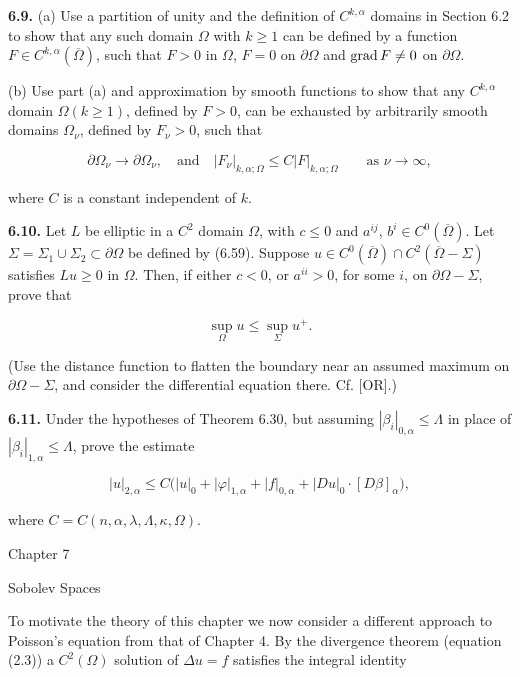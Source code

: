 \medskip

{\bf 6.9.} (a) Use a partition of unity and the definition of $C^{k,\alpha}$ domains in Section 6.2 to show that any such domain $\Omega$ with $k\ge1$ can be defined by a function $F\in C^{k,\alpha}(\overline{\Omega})$, such that $F>0$ in $\Omega$, $F=0$ on $\partial\Omega$ and $\operatorname{grad} F\ne0$ on $\partial\Omega$.

(b) Use part (a) and approximation by smooth functions to show that any $C^{k,\alpha}$ domain $\Omega(k\ge1)$, defined by $F>0$, can be exhausted by arbitrarily smooth domains $\Omega_\nu$, defined by $F_\nu>0$, such that

\[
\partial\Omega_\nu \to \partial\Omega_\nu,\quad\text{and}\quad |F_\nu|_{k,\alpha;\Omega}\le C|F|_{k,\alpha;\Omega}\qquad\text{as }\nu\to\infty,
\]

where $C$ is a constant independent of $k$.

\medskip

{\bf 6.10.} Let $L$ be elliptic in a $C^2$ domain $\Omega$, with $c\le0$ and $a^{ij}$, $b^i\in C^0(\overline{\Omega})$. Let $\Sigma=\Sigma_1\cup\Sigma_2\subset\partial\Omega$ be defined by (6.59). Suppose $u\in C^0(\overline{\Omega})\cap C^2(\overline{\Omega}-\Sigma)$ satisfies $Lu\ge0$ in $\Omega$. Then, if either $c<0$, or $a^{ii}>0$, for some $i$, on $\partial\Omega-\Sigma$, prove that

\[
\sup_\Omega u \le \sup_\Sigma u^+.
\]

(Use the distance function to flatten the boundary near an assumed maximum on $\partial\Omega-\Sigma$, and consider the differential equation there. Cf. [OR].)

\medskip

{\bf 6.11.} Under the hypotheses of Theorem 6.30, but assuming $|\beta_i|_{0,\alpha}\le\Lambda$ in place of $|\beta_i|_{1,\alpha}\le\Lambda$, prove the estimate

\[
|u|_{2,\alpha}\le C\bigl(|u|_0+|\varphi|_{1,\alpha}+|f|_{0,\alpha}+|Du|_0\cdot [D\beta]_\alpha\bigr),
\]

where $C=C(n,\alpha,\lambda,\Lambda,\kappa,\Omega)$.


Chapter 7

\begin{center}
\Large Sobolev Spaces
\end{center}

To motivate the theory of this chapter we now consider a different approach to
Poisson's equation from that of Chapter 4. By the divergence theorem (equation
(2.3)) a $C^2(\Omega)$ solution of $\Delta u = f$ satisfies the integral identity


